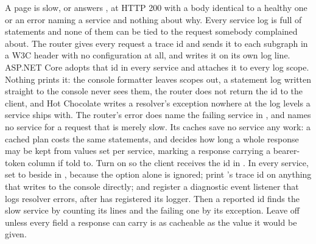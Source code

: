 \begin{problemsummary}
{A page is slow, or answers , at HTTP 200 with
a body identical to a healthy one or an error naming a service and nothing
about why. Every service log is full of statements and none of them can be
tied to the request somebody complained about.}
{The router gives every request a trace id and sends it to each subgraph in a
W3C  header with no configuration at all, and writes it on
its own log line. ASP.NET Core adopts that id in every service and attaches it
to every log scope. Nothing prints it: the console formatter leaves scopes
out, a statement log written straight to the console never sees them, the
router does not return the id to the client, and Hot Chocolate writes a resolver's exception nowhere at the log levels a
service ships with. The router's error does name the failing service
in , and names no service for a request that is merely
slow. Its caches save no service any work: a cached plan costs the same
statements, and  decides how long a whole response
may be kept from values set per service, marking a response carrying a
bearer-token column  if told to.}
{Turn on  so the client receives the id in
. In every service, set  to
 beside  in , because
the option alone is ignored; print 's trace id on
anything that writes to the console directly; and register a diagnostic event
listener that logs resolver errors, after  has
registered its logger. Then a reported id finds the
slow service by counting its lines and the failing one by its exception. Leave  off unless every field a response can
carry is as cacheable as the value it would be given.}
\end{problemsummary}
